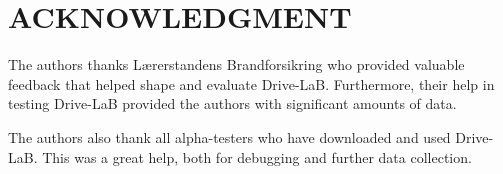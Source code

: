 \section*{ACKNOWLEDGMENT}

The authors thanks Lærerstandens Brandforsikring who provided valuable feedback that helped shape and evaluate Drive-LaB. Furthermore, their help in testing Drive-LaB provided the authors with significant amounts of data.

The authors also thank all alpha-testers who have downloaded and used Drive-LaB. This was a great help, both for debugging and further data collection.